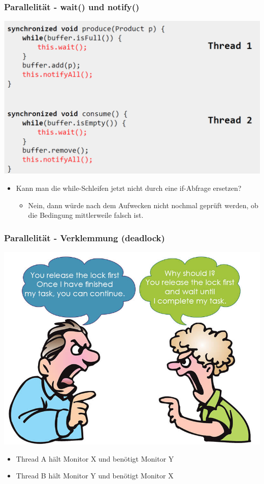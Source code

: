 \documentclass[18pt]{beamer}
\begin{document}
	\begin{frame}
		\frametitle{Parallelität - wait() und notify()}
		\includegraphics[scale=0.3]{./pics/tut5/cons-prod-sol.png}
		\begin{itemize}
			\item Kann man die while-Schleifen jetzt nicht durch eine if-Abfrage ersetzen? \pause
			\begin{itemize}
				\item Nein, dann würde nach dem Aufwecken nicht nochmal geprüft werden, ob die Bedingung mittlerweile falsch ist.
			\end{itemize}
		\end{itemize}
	\end{frame}

	\begin{frame}
		\frametitle{Parallelität - Verklemmung (deadlock)}
		\includegraphics[scale=0.3]{./pics/tut5/deadlock.jpg}
		\pause
		\begin{itemize}
			\item Thread A hält Monitor X und benötigt Monitor Y
			\item Thread B hält Monitor Y und benötigt Monitor X
		\end{itemize}
	\end{frame}
\end{document}

